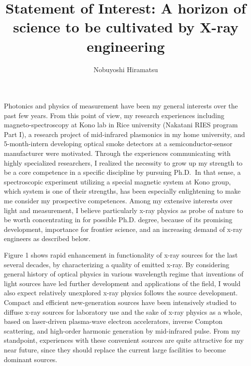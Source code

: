 \documentclass[aps,prb,reprint]{revtex4-1}
\begin{document}
\title{Statement of Interest: A horizon of science to be cultivated by X-ray engineering}
\author{Nobuyoshi Hiramatsu}

\maketitle

Photonics and physics of measurement\cite{Ozawa} have been my general interests over the past few years. From this point of view, my research experiences including magneto-spectroscopy at Kono lab in Rice university (Nakatani RIES program Part I), a research project of mid-infrared plasmonics in my home university, and 5-month-intern developing optical smoke detectors at a semiconductor-sensor manufacturer were motivated. Through the experiences communicating with highly specialized researchers, I realized the necessity to grow up my strength to be a core competence in a specific discipline by pursuing Ph.D. $\:$In that sense, a spectroscopic experiment utilizing a special magnetic system at Kono group, which system is one of their strengths, has been especially enlightening to make me consider my prospective competences. Among my extensive interests over light and measurement, I believe particularly x-ray physics as probe of nature to be worth concentrating in for possible Ph.D. degree, because of its promising development, importance for frontier science, and an increasing demand of x-ray engineers as described below.

Figure 1 shows rapid enhancement in functionality of x-ray sources for the last several decades\cite{Als-Nielsen}, by characterizing a quality of emitted x-ray. By considering general history of optical physics in various wavelength regime that inventions of light sources have led further development and applications of the field, I would also expect relatively unexplored x-ray physics follows the source development. Compact and efficient new-generation sources have been intensively studied to diffuse x-ray sources for laboratory use and the sake of x-ray physics as a whole, based on laser-driven plasma-wave electron accelerators\cite{Hooker}, inverse Compton scattering\cite{Fukuda}, and high-order harmonic generation by mid-infrared pulse\cite{Popmintchev,Weisshaupt}.  
From my standpoint, experiences with these convenient sources are quite attractive for my near future, since they should replace the current large facilities to become dominant sources.
\end{document}
